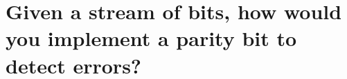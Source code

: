 \documentclass[main.tex]{subfiles}
\begin{document}
\section{Given a stream of bits, how would you implement a parity bit to detect errors?}

\spoilerline
\end{document}
